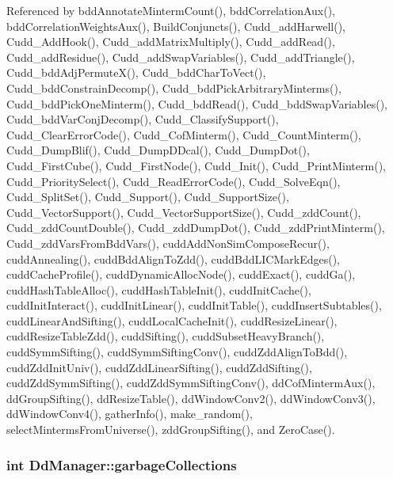 Referenced by bdd\-Annotate\-Minterm\-Count(), bdd\-Correlation\-Aux(), bdd\-Correlation\-Weights\-Aux(), Build\-Conjuncts(), Cudd\_\-add\-Harwell(), Cudd\_\-Add\-Hook(), Cudd\_\-add\-Matrix\-Multiply(), Cudd\_\-add\-Read(), Cudd\_\-add\-Residue(), Cudd\_\-add\-Swap\-Variables(), Cudd\_\-add\-Triangle(), Cudd\_\-bdd\-Adj\-Permute\-X(), Cudd\_\-bdd\-Char\-To\-Vect(), Cudd\_\-bdd\-Constrain\-Decomp(), Cudd\_\-bdd\-Pick\-Arbitrary\-Minterms(), Cudd\_\-bdd\-Pick\-One\-Minterm(), Cudd\_\-bdd\-Read(), Cudd\_\-bdd\-Swap\-Variables(), Cudd\_\-bdd\-Var\-Conj\-Decomp(), Cudd\_\-Classify\-Support(), Cudd\_\-Clear\-Error\-Code(), Cudd\_\-Cof\-Minterm(), Cudd\_\-Count\-Minterm(), Cudd\_\-Dump\-Blif(), Cudd\_\-Dump\-DDcal(), Cudd\_\-Dump\-Dot(), Cudd\_\-First\-Cube(), Cudd\_\-First\-Node(), Cudd\_\-Init(), Cudd\_\-Print\-Minterm(), Cudd\_\-Priority\-Select(), Cudd\_\-Read\-Error\-Code(), Cudd\_\-Solve\-Eqn(), Cudd\_\-Split\-Set(), Cudd\_\-Support(), Cudd\_\-Support\-Size(), Cudd\_\-Vector\-Support(), Cudd\_\-Vector\-Support\-Size(), Cudd\_\-zdd\-Count(), Cudd\_\-zdd\-Count\-Double(), Cudd\_\-zdd\-Dump\-Dot(), Cudd\_\-zdd\-Print\-Minterm(), Cudd\_\-zdd\-Vars\-From\-Bdd\-Vars(), cudd\-Add\-Non\-Sim\-Compose\-Recur(), cudd\-Annealing(), cudd\-Bdd\-Align\-To\-Zdd(), cudd\-Bdd\-LICMark\-Edges(), cudd\-Cache\-Profile(), cudd\-Dynamic\-Alloc\-Node(), cudd\-Exact(), cudd\-Ga(), cudd\-Hash\-Table\-Alloc(), cudd\-Hash\-Table\-Init(), cudd\-Init\-Cache(), cudd\-Init\-Interact(), cudd\-Init\-Linear(), cudd\-Init\-Table(), cudd\-Insert\-Subtables(), cudd\-Linear\-And\-Sifting(), cudd\-Local\-Cache\-Init(), cudd\-Resize\-Linear(), cudd\-Resize\-Table\-Zdd(), cudd\-Sifting(), cudd\-Subset\-Heavy\-Branch(), cudd\-Symm\-Sifting(), cudd\-Symm\-Sifting\-Conv(), cudd\-Zdd\-Align\-To\-Bdd(), cudd\-Zdd\-Init\-Univ(), cudd\-Zdd\-Linear\-Sifting(), cudd\-Zdd\-Sifting(), cudd\-Zdd\-Symm\-Sifting(), cudd\-Zdd\-Symm\-Sifting\-Conv(), dd\-Cof\-Minterm\-Aux(), dd\-Group\-Sifting(), dd\-Resize\-Table(), dd\-Window\-Conv2(), dd\-Window\-Conv3(), dd\-Window\-Conv4(), gather\-Info(), make\_\-random(), select\-Minterms\-From\-Universe(), zdd\-Group\-Sifting(), and Zero\-Case().
\subsubsection{\setlength{\rightskip}{0pt plus 5cm}int \bf{Dd\-Manager::garbage\-Collections}}\label{structDdManager_e880981ac1385c1e897e6eee995d79c5}




